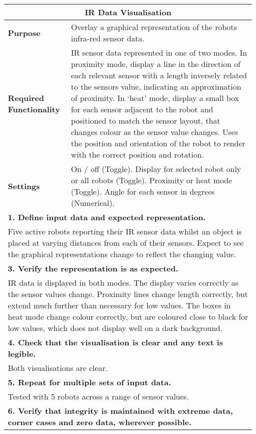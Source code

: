 \begin{longtable}{ l p{10cm} }
 \hline
 \multicolumn{2}{c}{\textbf{IR Data Visualisation}}\\
 \hline
 \textbf{Purpose} & Overlay a graphical representation of the robots infra-red sensor data.\\
 \textbf{Required Functionality} & IR sensor data represented in one of two modes. In proximity mode, display a line in the direction of each relevant sensor with a length inversely related to the sensors value, indicating an approximation of proximity. In `heat' mode, display a small box for each sensor adjacent to the robot and positioned to match the sensor layout, that changes colour as the sensor value changes. Uses the position and orientation of the robot to render with the correct position and rotation.\\
 \textbf{Settings} & On / off (Toggle). Display for selected robot only or all robots (Toggle). Proximity or heat mode (Toggle). Angle for each sensor in degrees (Numerical).\\
 \hline
 \multicolumn{2}{p{14cm}}{\textbf{1. Define input data and expected representation.}}\\
 \multicolumn{2}{p{14cm}}{Five active robots reporting their IR sensor data whilst an object is placed at varying distances from each of their sensors. Expect to see the graphical representations change to reflect the changing value.}\\
 \hline
 \multicolumn{2}{p{14cm}}{\textbf{3. Verify the representation is as expected.}}\\
 \multicolumn{2}{p{14cm}}{IR data is displayed in both modes. The display varies correctly as the sensor values change. Proximity lines change length correctly, but extend much further than necessary for low values. The boxes in heat mode change colour correctly, but are coloured close to black for low values, which does not display well on a dark background.}\\
 \hline
 \multicolumn{2}{p{14cm}}{\textbf{4. Check that the visualisation is clear and any text is legible.}}\\
 \multicolumn{2}{p{14cm}}{Both visualisations are clear.}\\
 \hline
 \multicolumn{2}{p{14cm}}{\textbf{5. Repeat for multiple sets of input data.}}\\
 \multicolumn{2}{p{14cm}}{Tested with 5 robots across a range of sensor values.}\\
 \hline
 \multicolumn{2}{p{14cm}}{\textbf{6. Verify that integrity is maintained with extreme data, corner cases and zero data, wherever possible.}}\\

\end{longtable}
